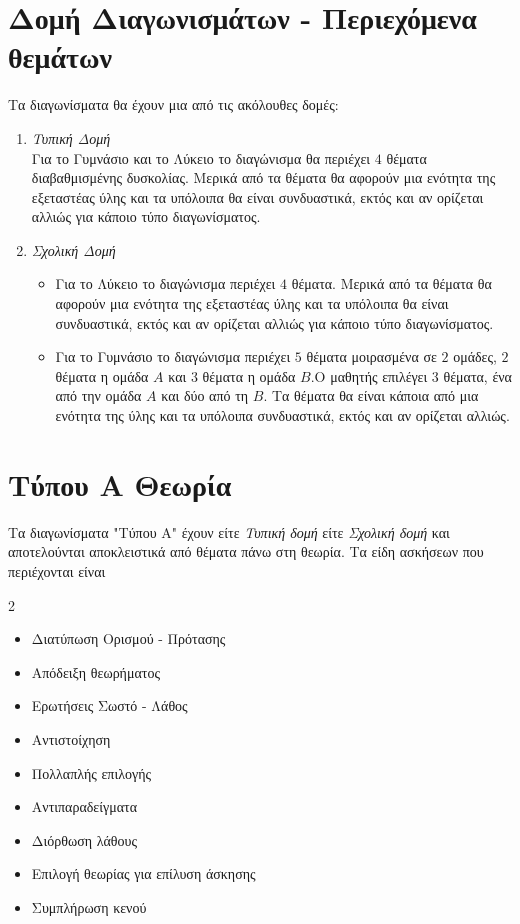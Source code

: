 \documentclass[11pt,a4paper]{book}
\begin{document}
\section{Δομή Διαγωνισμάτων - Περιεχόμενα θεμάτων}
Τα διαγωνίσματα θα έχουν μια από τις ακόλουθες δομές:
\begin{enumerate}
\item \textit{Τυπική Δομή}\\
Για το Γυμνάσιο και το Λύκειο το διαγώνισμα θα περιέχει $ 4 $ θέματα διαβαθμισμένης δυσκολίας. Μερικά από τα θέματα θα αφορούν μια ενότητα της εξεταστέας ύλης και τα υπόλοιπα θα είναι συνδυαστικά, εκτός και αν ορίζεται αλλιώς για κάποιο τύπο διαγωνίσματος.
\item \textit{Σχολική Δομή}
\begin{itemize}[leftmargin=0mm]
\item Για το Λύκειο το διαγώνισμα περιέχει $4$ θέματα. Μερικά από τα θέματα θα αφορούν μια ενότητα της εξεταστέας ύλης και τα υπόλοιπα θα είναι συνδυαστικά, εκτός και αν ορίζεται αλλιώς για κάποιο τύπο διαγωνίσματος.
\item Για το Γυμνάσιο το διαγώνισμα περιέχει $ 5 $ θέματα μοιρασμένα σε $ 2 $ ομάδες, $ 2 $ θέματα η ομάδα $ A $ και $ 3 $ θέματα η ομάδα $ B $.Ο μαθητής επιλέγει $ 3 $ θέματα, ένα από την ομάδα $ A $ και δύο από τη $ B $. Τα θέματα θα είναι κάποια από μια ενότητα της ύλης και τα υπόλοιπα συνδυαστικά, εκτός και αν ορίζεται αλλιώς.
\end{itemize}
\end{enumerate}
\section{Τύπου Α Θεωρία}
\noindent
Τα διαγωνίσματα "Τύπου A" έχουν είτε \textit{Τυπική δομή} είτε \textit{Σχολική δομή} και αποτελούνται αποκλειστικά από θέματα πάνω στη θεωρία. Τα είδη ασκήσεων που περιέχονται είναι
\begin{multicols}{2}
\begin{itemize}[itemsep=0mm]
\item Διατύπωση Ορισμού - Πρότασης
\item Απόδειξη θεωρήματος
\item Ερωτήσεις Σωστό - Λάθος
\item Αντιστοίχηση
\item Πολλαπλής επιλογής
\item Αντιπαραδείγματα
\item Διόρθωση λάθους
\item Επιλογή θεωρίας για επίλυση άσκησης
\item Συμπλήρωση κενού
\end{itemize}
\end{multicols}
\end{document}
